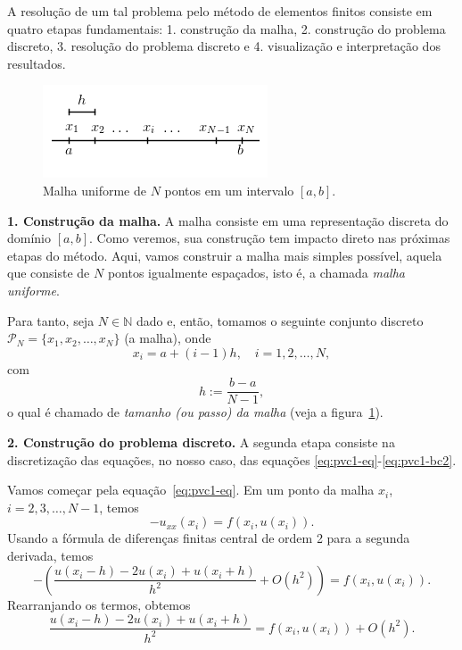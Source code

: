 A resolução de um tal problema pelo método de elementos finitos consiste em quatro etapas fundamentais: 1. construção da malha, 2. construção do problema discreto, 3. resolução do problema discreto e 4. visualização e interpretação dos resultados. 

\begin{figure}
  \centering
  \includegraphics{./cap_pvc/pics/malha_uniforme/malha_uniforme}
  \caption{Malha uniforme de $N$ pontos em um intervalo $[a, b]$.}
  \label{fig:malha_uniforme}
\end{figure}

{\bf 1. Construção da malha.} A malha consiste em uma representação discreta do domínio $[a, b]$. Como veremos, sua construção tem impacto direto nas próximas etapas do método. Aqui, vamos construir a malha mais simples possível, aquela que consiste de $N$ pontos igualmente espaçados, isto é, a chamada \emph{malha uniforme}.

Para tanto, seja $N\in\mathbb{N}$ dado e, então, tomamos o seguinte conjunto discreto $\mathcal{P}_N = \{x_1, x_2, \dotsc, x_N\}$ (a malha), onde
\begin{equation*}
  x_i = a + (i-1)h,\quad i=1, 2, \dotsc, N,
\end{equation*}
com
\begin{equation*}
  h:=\frac{b-a}{N-1},
\end{equation*}
o qual é chamado de \emph{tamanho (ou passo) da malha} (veja a figura~\ref{fig:malha_uniforme}).

{\bf 2. Construção do problema discreto.} A segunda etapa consiste na discretização das equações, no nosso caso, das equações \eqref{eq:pvc1-eq}-\eqref{eq:pvc1-bc2}. 

Vamos começar pela equação~\eqref{eq:pvc1-eq}. Em um ponto da malha $x_i$, $i = 2, 3, \dotsc, N-1$, temos
\begin{equation*}
  -u_{xx}(x_i) = f(x_i, u(x_i)).
\end{equation*}
Usando a fórmula de diferenças finitas central de ordem 2 para a segunda derivada, temos
\begin{equation*}
  -\left(\frac{u(x_i-h) - 2u(x_i) + u(x_i+h)}{h^2} + O(h^2)\right) = f(x_i, u(x_i)).
\end{equation*}
Rearranjando os termos, obtemos
\begin{equation*}
  \frac{u(x_i-h) - 2u(x_i) + u(x_i+h)}{h^2} = f(x_i, u(x_i)) + O(h^2). 
\end{equation*}

